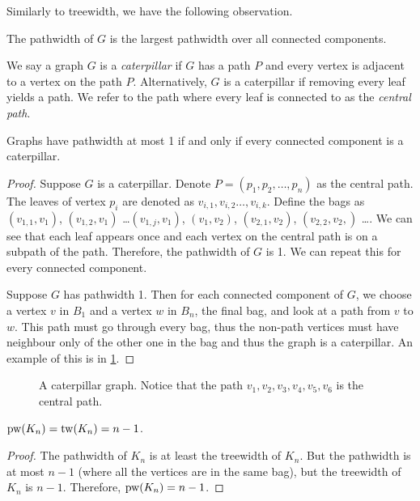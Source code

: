 Similarly to treewidth, we have the following observation.
\begin{lemma}
	The pathwidth of \(G\) is the largest pathwidth over all connected components.
\end{lemma}
We say a graph \(G\) is a \textit{caterpillar} if \(G\) has a path \(P\) and every vertex is adjacent to a vertex on the path \(P\). Alternatively, \(G\) is a caterpillar if removing every leaf yields a path. We refer to the path where every leaf is connected to as the \textit{central path}.
\begin{theorem}[Caterpillars]
	Graphs have pathwidth at most 1 if and only if every connected component is a caterpillar.
\end{theorem}
\begin{proof}
	Suppose \(G\) is a caterpillar.
	Denote \(P =\left( p_1, p_2, \dots, p_n\right)\) as the central path. The leaves of vertex \(p_i\) are denoted as \(v_{i, 1}, v_{i, 2} \dots, v_{i, k}\). Define the bags as \((v_{1, 1}, v_1)\), \((v_{1, 2}, v_1)\) \dots \((v_{1, j}, v_1)\),  \((v_1, v_2)\), \((v_{2, 1}, v_2)\), \((v_{2,2}, v_2,)\) \dots. We can see that each leaf appears once and each vertex on the central path is on a subpath of the path. Therefore, the pathwidth of \(G\) is 1. We can repeat this for every connected component.
	\par
	Suppose \(G\) has pathwidth 1. Then for each connected component of \(G\), we choose a vertex \(v\) in \(B_1\) and a vertex \(w\) in \(B_n\), the final bag, and look at a path from \(v\) to \(w\). This path must go through every bag, thus the non-path vertices must have neighbour only of the other one in the bag and thus the graph is a caterpillar. An example of this is in \cref{fig:caterpillar}.
\end{proof}
\begin{figure}[ht]
	\centering
	
	\caption{A caterpillar graph. Notice that the path \(v_1, v_2, v_3, v_4, v_5, v_6\) is the central path.}
	\label{fig:caterpillar}
\end{figure}

\begin{example}
	\(\operatorname{pw}(K_n) = \operatorname{tw}(K_n) = n - 1\).
\end{example}
\begin{proof}
	The pathwidth of \(K_n\) is at least the treewidth of \(K_n\). But the pathwidth is at most \(n- 1\) (where all the vertices are in the same bag), but the treewidth of \(K_n\) is \(n - 1\). Therefore, \(\operatorname{pw}(K_n) = n - 1\).
\end{proof}

